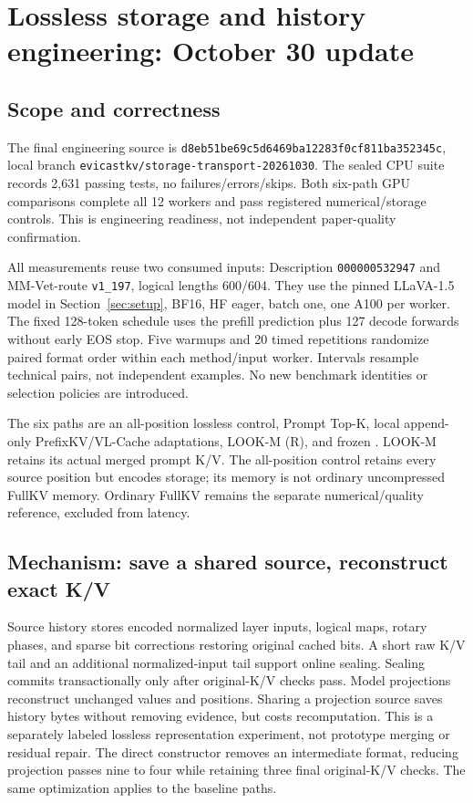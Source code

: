 \section{Lossless storage and history engineering: October 30 update}
\label{sec:historyengineering}
\subsection{Scope and correctness}
The final engineering source is
\nolinkurl{d8eb51be69c5d6469ba12283f0cf811ba352345c}, local branch
\nolinkurl{evicastkv/storage-transport-20261030}. The sealed CPU suite records
2,631 passing tests, no failures/errors/skips. Both six-path GPU comparisons
complete all 12 workers and pass registered numerical/storage controls.
This is engineering readiness, not independent paper-quality confirmation.

All measurements reuse two consumed inputs: Description
\texttt{000000532947} and MM-Vet-route \texttt{v1\_197}, logical lengths
600/604. They use the pinned LLaVA-1.5 model in Section~\ref{sec:setup},
BF16, HF eager, batch one, one A100 per worker. The fixed 128-token schedule
uses the prefill prediction plus 127 decode forwards without early EOS stop.
Five warmups and 20 timed repetitions randomize paired format order within
each method/input worker. Intervals resample technical pairs, not independent
examples. No new benchmark identities or selection policies are introduced.

The six paths are an all-position lossless control, Prompt Top-K, local
append-only PrefixKV/VL-Cache adaptations, LOOK-M (R), and frozen
. LOOK-M retains its actual merged prompt K/V. The
all-position control retains every source position but encodes storage;
its memory is not ordinary uncompressed FullKV memory. Ordinary FullKV
remains the separate numerical/quality reference, excluded from latency.

\subsection{Mechanism: save a shared source, reconstruct exact K/V}
Source history stores encoded normalized layer inputs, logical maps, rotary
phases, and sparse bit corrections restoring original cached bits. A short
raw K/V tail and an additional normalized-input tail support online sealing.
Sealing commits transactionally only after original-K/V checks pass. Model
projections reconstruct unchanged values and positions. Sharing a projection
source saves history bytes without removing evidence, but costs recomputation.
This is a separately labeled lossless representation experiment, not prototype
merging or residual repair. The direct constructor removes an intermediate
format, reducing projection passes nine to four while retaining three final
original-K/V checks. The same optimization applies to the baseline paths.

